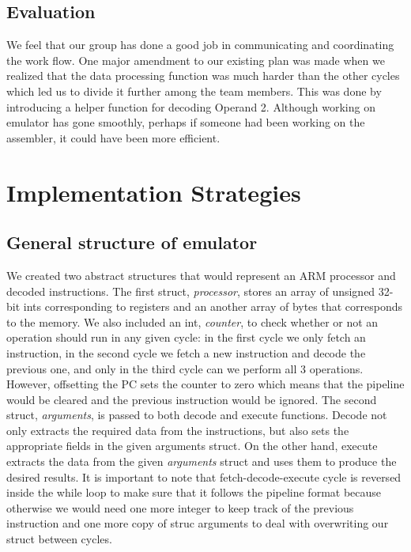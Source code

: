 \documentclass[11pt]{article}
\begin{document}
	\subsection{Evaluation}
	We feel that our group has done a good job in communicating and coordinating the work flow. One major amendment to our existing plan was made when we realized that the data processing function was much harder than the other cycles which led us to divide it further among the team members. This was done by introducing a helper function for decoding Operand 2. Although working on emulator has gone smoothly, perhaps if someone had been working on the assembler, it could have been more efficient.	
	


\section{Implementation Strategies}
	\subsection{General structure of emulator}
	We created two abstract structures that would represent an ARM processor and decoded instructions. The first struct, \textit{processor}, stores an array of unsigned 32-bit ints  corresponding to registers and an another array of bytes that corresponds to the memory. We also included an int, \textit{counter}, to check whether or not an operation should run in any given cycle: in the first cycle we only fetch an instruction, in the second cycle we fetch a new instruction and decode the previous one, and only in the third cycle can we perform all 3 operations. However, offsetting the PC sets the counter to zero which means that the pipeline would be cleared and the previous instruction would be ignored. The second struct, \textit{arguments}, is passed to both decode and execute functions. Decode not only extracts the required data from the instructions, but also sets the appropriate fields in the given arguments struct. On the other hand, execute extracts the data from the given \textit{arguments} struct and uses them to produce the desired results. It is important to note that fetch-decode-execute cycle is reversed inside the while loop to make sure that it follows the pipeline format because otherwise we would need one more integer to keep track of the previous instruction and one more copy of struc arguments to deal with overwriting our struct between cycles.
	  
\end{document}
